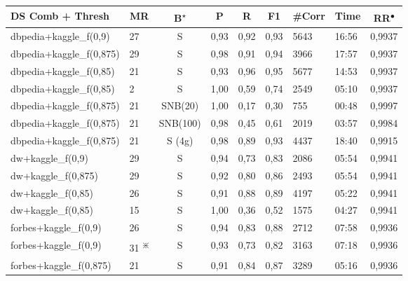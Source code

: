\documentclass[11pt,titlepage,oneside,openany]{article}
\begin{document}
\begin{table}[]
	\small
	\begin{tabular}{llcllllll}
		\textbf{DS Comb   + Thresh} & \multicolumn{1}{c}{\textbf{MR}} & \textbf{B\textsuperscript{$\star$}} & \multicolumn{1}{c}{\textbf{P}} & \multicolumn{1}{c}{\textbf{R}} & \multicolumn{1}{c}{\textbf{F1}} & \multicolumn{1}{c}{\textbf{\#Corr}} & \multicolumn{1}{c}{\textbf{Time}} & \multicolumn{1}{c}{\textbf{RR\textsuperscript{$\bullet$}}} \\\hline
		dbpedia+kaggle\_f(0,9)   & 27 & S        & 0,93 & 0,92 & 0,93 & 5643 & 16:56 & 0,9937 \\
		\rowcolor[HTML]{FFFFCC} 
		dbpedia+kaggle\_f(0,875) & 29 & S        & 0,98 & 0,91 & 0,94 & 3966 & 17:57 & 0,9937 \\
		dbpedia+kaggle\_f(0,85)  & 21 & S        & 0,93 & 0,96 & 0,95 & 5677 & 14:53 & 0,9937 \\
		\rowcolor[HTML]{FCCCC8} 
		dbpedia+kaggle\_f(0,85)  & 2  & S        & 1,00 & 0,59 & 0,74 & 2549 & 05:10 & 0,9937 \\
		\rowcolor[HTML]{DDEBF7} 
		dbpedia+kaggle\_f(0,875) & 21 & SNB(20)  & 1,00 & 0,17 & 0,30 & 755  & 00:48 & 0,9997 \\
		\rowcolor[HTML]{DDEBF7} 
		dbpedia+kaggle\_f(0,875) & 21 & SNB(100) & 0,98 & 0,45 & 0,61 & 2019 & 03:57 & 0,9984 \\
		\rowcolor[HTML]{DDEBF7} 
		dbpedia+kaggle\_f(0,875) & 21 & S (4g)   & 0,98 & 0,89 & 0,93 & 4437 & 18:40 & 0,9915 \\\hline\hline
		\rowcolor[HTML]{FFFFCC} 
		dw+kaggle\_f(0,9)        & 29 & S        & 0,94 & 0,73 & 0,83 & 2086 & 05:54 & 0,9941 \\
		dw+kaggle\_f(0,875)      & 29 & S        & 0,92 & 0,80 & 0,86 & 2493 & 05:54 & 0,9941 \\
		dw+kaggle\_f(0,85)       & 26 & S        & 0,91 & 0,88 & 0,89 & 4197 & 05:22 & 0,9941 \\
		\rowcolor[HTML]{FCCCC8} 
		dw+kaggle\_f(0,85)       & 15 & S        & 1,00 & 0,36 & 0,52 & 1575 & 04:27 & 0,9941 \\\hline\hline
		\rowcolor[HTML]{FFFFCC} 
		forbes+kaggle\_f(0,9)    & 26 & S        & 0,94 & 0,83 & 0,88 & 2712 & 07:58 & 0,9936 \\
		\rowcolor[HTML]{E7E6E6} 
		forbes+kaggle\_f(0,9)    & 31 \textsuperscript{$\divideontimes$} & S        & 0,93 & 0,73 & 0,82 & 3163 & 07:18 & 0,9936 \\
		forbes+kaggle\_f(0,875)  & 21 & S        & 0,91 & 0,84 & 0,87 & 3289 & 05:16 & 0,9936 \\

\end{tabular}
\end{table}
\end{document}
